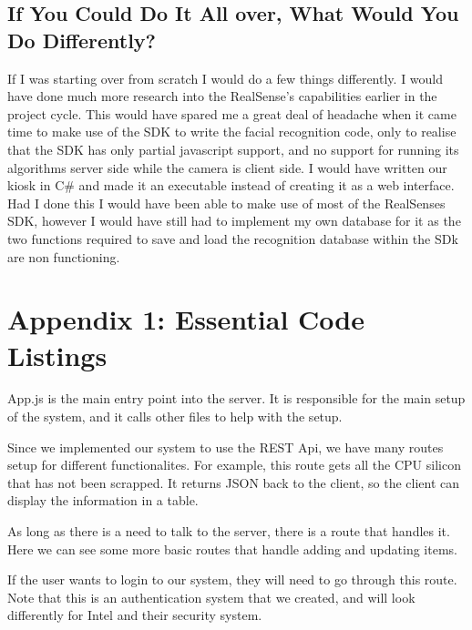 \documentclass[10pt, onecolumn, twoside, peerreview]{IEEEtran}
\begin{document}
\subsection{If You Could Do It All over, What Would You Do Differently?}
If I was starting over from scratch I would do a few things differently. I would have done much more research into the RealSense's capabilities earlier in the project cycle. This would have spared me a great deal of headache when it came time to make use of the SDK to write the facial recognition code, only to realise that the SDK has only partial javascript support, and no support for running its algorithms server side while the camera is client side. I would have written our kiosk in C\# and made it an executable instead of creating it as a web interface. Had I done this I would have been able to make use of most of the RealSenses SDK, however I would have still had to implement my own database for it as the two functions required to save and load the recognition database within the SDk are non functioning.

\section{Appendix 1: Essential Code Listings}
App.js is the main entry point into the server. It is responsible for the main setup of the system, and it calls other files to help with the setup.



Since we implemented our system to use the REST Api, we have many routes setup for different functionalites. For example, this route gets all the CPU silicon that has not been scrapped. It returns JSON back to the client, so the client can display the information in a table.



As long as there is a need to talk to the server, there is a route that handles it. Here we can see some more basic routes that handle adding and updating items.




If the user wants to login to our system, they will need to go through this route. Note that this is an authentication system that we created, and will look differently for Intel and their security system.
\end{document}
